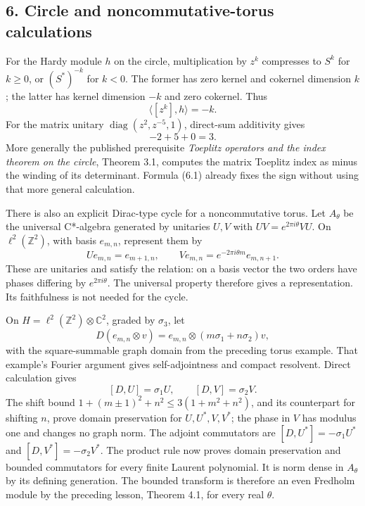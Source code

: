 \documentclass[
  11pt,
]{article}
\begin{document}
\subsection{6. Circle and noncommutative-torus
calculations}\label{circle-and-noncommutative-torus-calculations}

For the Hardy module \(h\) on the circle, multiplication by \(z^k\)
compresses to \(S^k\) for \(k\geq0\), or \((S^*)^{-k}\) for \(k<0\). The
former has zero kernel and cokernel dimension \(k\); the latter has
kernel dimension \(-k\) and zero cokernel. Thus \[
\langle[z^k],h\rangle=-k.
\tag{6.1}
\] For the matrix unitary \(\operatorname{diag}(z^2,z^{-5},1)\),
direct-sum additivity gives \[
-2+5+0=3.
\tag{6.2}
\] More generally the published prerequisite \emph{Toeplitz operators
and the index theorem on the circle}, Theorem 3.1, computes the matrix
Toeplitz index as minus the winding of its determinant. Formula (6.1)
already fixes the sign without using that more general calculation.

There is also an explicit Dirac-type cycle for a noncommutative torus.
Let \(A_\theta\) be the universal C*-algebra generated by unitaries
\(U,V\) with \(UV=e^{2\pi i\theta}VU\). On \(\ell^2(\mathbb Z^2)\), with
basis \(e_{m,n}\), represent them by \[
Ue_{m,n}=e_{m+1,n},\qquad
Ve_{m,n}=e^{-2\pi i\theta m}e_{m,n+1}.
\tag{6.3}
\] These are unitaries and satisfy the relation: on a basis vector the
two orders have phases differing by \(e^{2\pi i\theta}\). The universal
property therefore gives a representation. Its faithfulness is not
needed for the cycle.

On \(H=\ell^2(\mathbb Z^2)\otimes\mathbb C^2\), graded by \(\sigma_3\),
let \[
D(e_{m,n}\otimes v)
=e_{m,n}\otimes(m\sigma_1+n\sigma_2)v,
\tag{6.4}
\] with the square-summable graph domain from the preceding torus
example. That example's Fourier argument gives self-adjointness and
compact resolvent. Direct calculation gives \[
[D,U]=\sigma_1U,\qquad [D,V]=\sigma_2V.
\tag{6.5}
\] The shift bound \(1+(m\pm1)^2+n^2\leq3(1+m^2+n^2)\), and its
counterpart for shifting \(n\), prove domain preservation for
\(U,U^*,V,V^*\); the phase in \(V\) has modulus one and changes no graph
norm. The adjoint commutators are \([D,U^*]=-\sigma_1U^*\) and
\([D,V^*]=-\sigma_2V^*\). The product rule now proves domain
preservation and bounded commutators for every finite Laurent
polynomial. It is norm dense in \(A_\theta\) by its defining generation.
The bounded transform is therefore an even Fredholm module by the
preceding lesson, Theorem 4.1, for every real \(\theta\).
\end{document}
